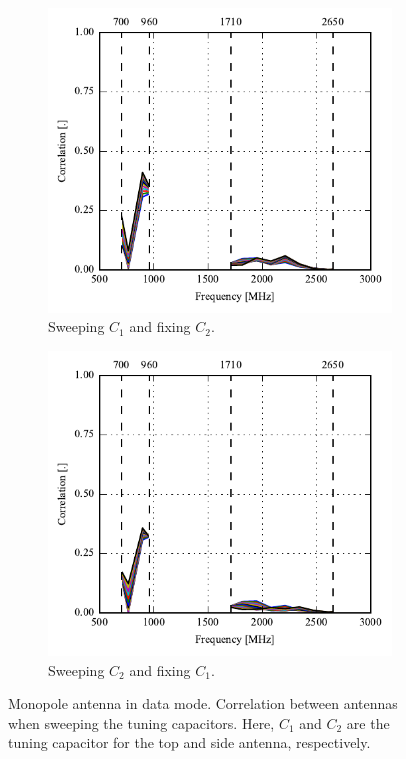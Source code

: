 \begin{figure}[htbp]
    \centering
    \begin{subfigure}{0.49\linewidth}
        \includegraphics{img/tech_sol/monopole/data_mode/s11_corr}
        \caption{Sweeping $C_1$ and fixing $C_2$.}
    \end{subfigure}
    \hfill
    \begin{subfigure}{0.49\linewidth}
        \includegraphics{img/tech_sol/monopole/data_mode/s22_corr}
        \caption{Sweeping $C_2$ and fixing $C_1$.}
    \end{subfigure}
    \caption{Monopole antenna in data mode. Correlation between antennas when sweeping the tuning capacitors. Here, $C_1$ and $C_2$ are the tuning capacitor for the top and side antenna, respectively.}
    \label{fig:corr_sol1_data}
\end{figure}

